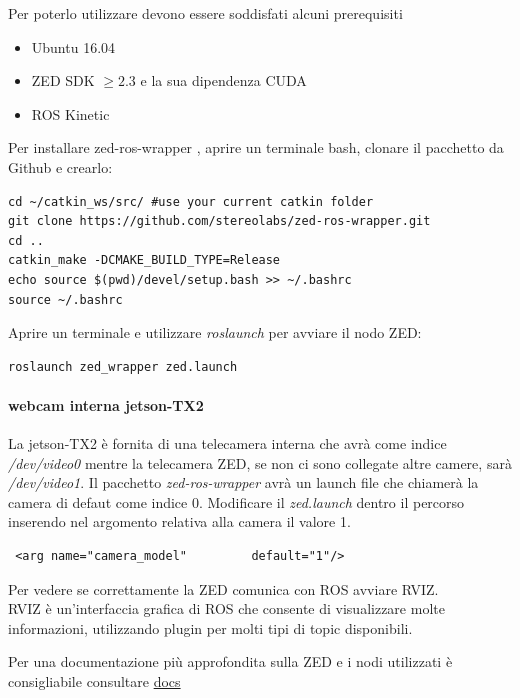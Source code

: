 \documentclass[a4paper]{article}
\begin{document}
Per  poterlo utilizzare devono essere soddisfati alcuni prerequisiti

\begin{itemize}
\item Ubuntu 16.04
\item ZED SDK $\ge 2.3 $   e la sua dipendenza CUDA
\item ROS Kinetic
\end{itemize}

Per installare zed-ros-wrapper , aprire un terminale bash, clonare il pacchetto da Github e crearlo:
\begin{verbatim}
cd ~/catkin_ws/src/ #use your current catkin folder
git clone https://github.com/stereolabs/zed-ros-wrapper.git
cd ..
catkin_make -DCMAKE_BUILD_TYPE=Release
echo source $(pwd)/devel/setup.bash >> ~/.bashrc
source ~/.bashrc
\end{verbatim}

Aprire un terminale e utilizzare \textit{roslaunch} per avviare il nodo ZED:

\begin{verbatim}
roslaunch zed_wrapper zed.launch
\end{verbatim}

\paragraph{webcam interna jetson-TX2}
La jetson-TX2 è fornita di una telecamera interna che avrà come indice \textit{/dev/video0} mentre la telecamera ZED, se non ci sono collegate altre camere, sarà \textit{/dev/video1}. Il pacchetto \textit{zed-ros-wrapper} avrà un launch file che chiamerà la camera di defaut come indice 0. Modificare il \textit{zed.launch} dentro il percorso   inserendo nel argomento relativa alla camera il valore 1.
\begin{verbatim}
 <arg name="camera_model"         default="1"/>
\end{verbatim}


Per vedere se correttamente la ZED comunica con ROS avviare RVIZ.
\\
RVIZ è un'interfaccia grafica di ROS che consente di visualizzare molte informazioni, utilizzando plugin per molti tipi di topic disponibili.





Per una documentazione più approfondita sulla ZED e i nodi utilizzati è consigliabile consultare 
\textcolor{red}{\href{https://www.stereolabs.com/docs/getting-started/}{docs}}
\end{document}
